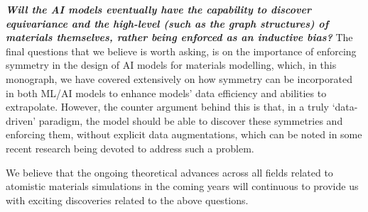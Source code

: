 

\textbf{\emph{Will the AI models eventually have the capability to discover equivariance and the high-level (such as the graph structures) of materials themselves, rather being enforced as an inductive bias?}} The final questions that we believe is worth asking, is on the importance of enforcing symmetry in the design of AI models for materials modelling, which, in this monograph, we have covered extensively on how symmetry can be incorporated in both ML/AI models to enhance models' data efficiency and abilities to extrapolate. However, the counter argument behind this is that, in a truly `data-driven' paradigm, the model should be able to discover these symmetries and enforcing them, without explicit data augmentations,\cite{duval2023hitchhiker} which can be noted in some recent research being devoted to address such a problem.\cite{domina2026unconstrained,bigi2026pushing,langer2024probing} 

We believe that the ongoing theoretical advances across all fields related to atomistic materials simulations in the coming years will continuous to provide us with exciting discoveries related to the above questions. 